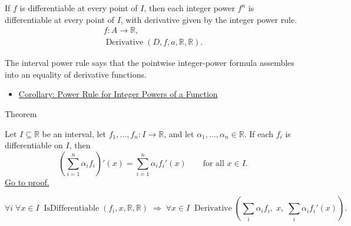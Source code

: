 \begin{remark*}
If $f$ is differentiable at every point of $I$, then each integer power
$f^n$ is differentiable at every point of $I$, with derivative given by the
integer power rule.
\[
\begin{aligned}
  f\colon A\to\mathbb{R},\\
  \operatorname{Derivative}(D,f,a,\mathbb{R},\mathbb{R}).
\end{aligned}
\]
\end{remark*}

\begin{remark*}[Interpretation]
The interval power rule says that the pointwise integer-power formula assembles into an equality of derivative functions.
\end{remark*}

\begin{dependencies}
\begin{itemize}
  \item \hyperref[cor:power-rule-special-case]{Corollary: Power Rule for Integer Powers of a Function}
\end{itemize}
\end{dependencies}


\begin{theorembox}{Theorem}
\begin{theorem}
\label{thm:finite-linear-combination-rule-interval}
Let $I \subseteq \mathbb{R}$ be an interval, let $f_1, \dots, f_n : I \to \mathbb{R}$, and let $\alpha_1, \dots, \alpha_n \in \mathbb{R}$. If each $f_i$ is differentiable on $I$, then
\[
\left(\sum_{i=1}^{n} \alpha_i f_i\right)'(x) = \sum_{i=1}^{n} \alpha_i f_i'(x) \qquad \text{for all } x \in I.
\]
\hyperref[prf:finite-linear-combination-rule-interval]{Go to proof.}
\end{theorem}
\end{theorembox}

\begin{remark*}
\[
\forall i\;\forall x\in I\;\operatorname{IsDifferentiable}(f_i,x,\mathbb{R},\mathbb{R})
\;\Rightarrow\;
\forall x\in I\;\operatorname{Derivative}\!\left(\textstyle\sum_i\alpha_i f_i,\;x,\;\textstyle\sum_i\alpha_i f_i'(x)\right).
\]
\end{remark*}


